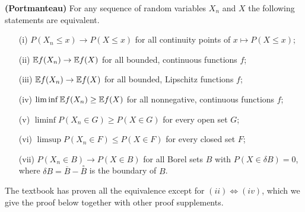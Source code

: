 \documentclass{article}
\begin{document}
\begin{lemma}
    \label{lemma:portmanteau}
    \textbf{(Portmanteau)} For any sequence of random variables $X_n$ and $X$ the following statements are equivalent.
    \begin{itemize}
        \item[(i)] $P(X_n \leq x) \to P(X \leq x)$ for all continuity points of $x \mapsto P(X \leq x)$;
        \item[(ii)] $\mathbb{E} f(X_n) \to \mathbb{E} f(X)$ for all bounded, continuous functions $f$;
        \item[(iii)] $\mathbb{E} f(X_n) \to \mathbb{E} f(X)$ for all bounded, Lipschitz functions $f$;
        \item[(iv)] $\liminf \mathbb{E} f(X_n) \geq \mathbb{E} f(X)$ for all nonnegative, continuous functions $f$;
        \item[(v)] $\liminf P(X_n \in G) \geq P(X \in G)$ for every open set $G$;
        \item[(vi)] $\limsup P(X_n \in F) \leq P(X \in F)$ for every closed set $F$;
        \item[(vii)] $P(X_n \in B) \to P(X \in B)$ for all Borel sets $B$ with $P(X \in \delta B) = 0$, where $\delta B = \overline{B} - \overset{\circ}{B}$ is the boundary of $B$.
    \end{itemize}
\end{lemma}

The textbook has proven all the equivalence except for $(ii) \Leftrightarrow (iv)$, which we give the proof below together with other proof supplements.
\end{document}
